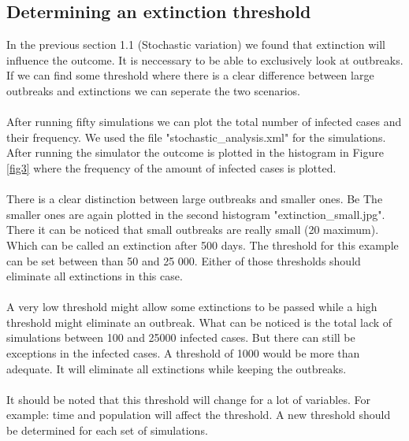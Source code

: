 \documentclass[runningheads]{llncs}
\begin{document}
\subsection{Determining an extinction threshold}
In the previous section 1.1 (Stochastic variation) we found that extinction will influence the outcome. It is neccessary to be able to exclusively look at outbreaks. If we can find some threshold where there is a clear difference between large outbreaks and extinctions we can seperate the two scenarios.\\ \\
After running fifty simulations we can plot the total number of infected cases and their frequency.  We used the file "stochastic\_analysis.xml" for the simulations. After running the simulator the outcome is plotted in the histogram in Figure \ref{fig3} where the frequency of the amount of infected cases is plotted.\\ \\
There is a clear distinction between large outbreaks and smaller ones. Be The smaller ones are again plotted in the second histogram "extinction\_small.jpg". There it can be noticed that small outbreaks are really small (20 maximum). Which can be called an extinction after 500 days. The threshold for this example can be set between than 50 and 25 000. Either of those thresholds should eliminate all extinctions in this case.\\ \\
A very low threshold might allow some extinctions to be passed while a high threshold might eliminate an outbreak. What can be noticed is the total lack of simulations between 100 and 25000 infected cases. But there can still be exceptions in the infected cases. A threshold of 1000 would be more than adequate. It will eliminate all extinctions while keeping the outbreaks.\\ \\
It should be noted that this threshold will change for a lot of variables. For example: time and population will affect the threshold. A new threshold should be determined for each set of simulations.
\end{document}
